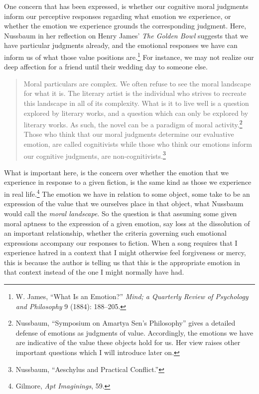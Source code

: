 \documentclass[phdthesis,12pt,final]{wuthesis}
\theoremstyle{definition}
\theoremstyle{definition}
\theoremstyle{definition}
\theoremstyle{definition}
\theoremstyle{remark}
\begin{document}
One concern that has been expressed, is whether our cognitive moral judgments inform our perceptive responses regarding what emotion we experience, or whether the emotion we experience grounds the corresponding judgment. Here, Nussbaum in her reflection on Henry James' \emph{The Golden Bowl} suggests that we have particular judgments already, and the emotional responses we have can inform us of what those value positions are.\footnote{W. James, {``What Is an Emotion?''} \emph{Mind; a Quarterly Review of Psychology and Philosophy} 9 (1884): 188--205.} For instance, we may not realize our deep affection for a friend until their wedding day to someone else.

\begin{quote}
Moral particulars are complex. We often refuse to see the moral landscape for what it is. The literary artist is the individual who strives to recreate this landscape in all of its complexity. What is it to live well is a question explored by literary works, and a question which can only be explored by literary works. As such, the novel can be a paradigm of moral activity.\footnote{Nussbaum, {``Symposium on {Amartya Sen}'s Philosophy''} gives a detailed defense of emotions as judgments of value. Accordingly, the emotions we have are indicative of the value these objects hold for us. Her view raises other important questions which I will introduce later on.} Those who think that our moral judgments determine our evaluative emotion, are called cognitivists while those who think our emotions inform our cognitive judgments, are non-cognitivists.\footnote{Nussbaum, {``Aeschylus and Practical Conflict.''}}
\end{quote}

What is important here, is the concern over whether the emotion that we experience in response to a given fiction, is the same kind as those we experience in real life.\footnote{Gilmore, \emph{Apt {Imaginings}}, 59.} The emotion we have in relation to some object, some take to be an expression of the value that we ourselves place in that object, what Nussbaum would call the \emph{moral landscape}. So the question is that assuming some given moral aptness to the expression of a given emotion, say loss at the dissolution of an important relationship, whether the criteria governing such emotional expressions accompany our responses to fiction. When a song requires that I experience hatred in a context that I might otherwise feel forgiveness or mercy, this is because the author is telling us that this is the appropriate emotion in that context instead of the one I might normally have had.
\end{document}
